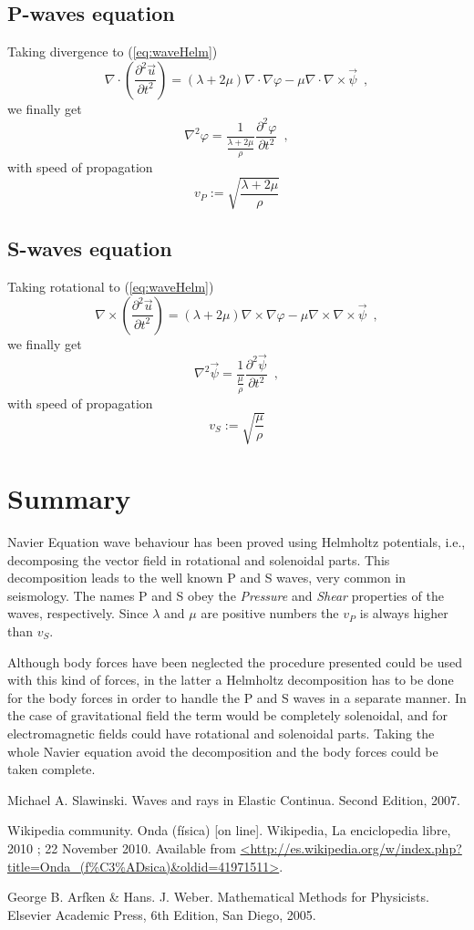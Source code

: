 \documentclass[12pt,letterpaper]{article}
\newcommand{\pardiff}[2]{\frac{\partial #1}{\partial #2}}
\begin{document}
\subsection{P-waves equation}
Taking divergence to (\ref{eq:waveHelm})
\[\nabla\cdot \left( \pardiff{^2 \vec{u}}{t^2} \right)= (\lambda +2\mu) \nabla\cdot \nabla \varphi - \mu\nabla\cdot\nabla\times \vec{\psi} \enspace , \]
we finally get
\begin{equation}
\nabla^2 \varphi = \frac{1}{\frac{\lambda + 2\mu}{\rho}} \pardiff{^2 \varphi}{t^2} \enspace ,
\label{eq:pWave}
\end{equation}
with speed of propagation
\[v_P := \sqrt{\frac{\lambda + 2\mu}{\rho}}\]

\subsection{S-waves equation}
Taking rotational to (\ref{eq:waveHelm})
\[\nabla\times \left( \pardiff{^2 \vec{u}}{t^2} \right)= (\lambda +2\mu) \nabla\times \nabla \varphi - \mu\nabla\times\nabla\times \vec{\psi} \enspace , \]
we finally get
\begin{equation}
\nabla^2 \vec{\psi} = \frac{1}{\frac{\mu}{\rho}} \pardiff{^2 \vec{\psi}}{t^2} \enspace ,
\label{eq:SWave}
\end{equation}
with speed of propagation
\[v_S := \sqrt{\frac{\mu}{\rho}}\]

\section{Summary}

Navier Equation wave behaviour has been proved using Helmholtz potentials, i.e., decomposing the vector field in rotational and solenoidal parts. This decomposition leads to the well known P and S waves, very common in seismology. The names P and S  obey the \emph{Pressure} and \emph{Shear} properties of the waves, respectively. Since $\lambda$ and $\mu$ are positive numbers the $v_P$ is always higher than $v_S$.

Although body forces have been neglected the procedure presented could be used with this kind of forces, in the latter a Helmholtz decomposition has to be done for the body forces in order to handle the P and S waves in a separate manner. In the case of gravitational field the term would be completely solenoidal, and for electromagnetic fields could have rotational and solenoidal parts. Taking the whole Navier equation avoid the decomposition and the body forces could be taken complete.
\pagebreak

\begin{thebibliography}{99}
 Michael A. Slawinski. Waves and rays in Elastic Continua. Second Edition, 2007.
 
 Wikipedia community. Onda (f\'isica) [on line]. Wikipedia, La enciclopedia libre, 2010 ; 22 November 2010. Available from \url{<http://es.wikipedia.org/w/index.php?title=Onda_(f%C3%ADsica)&oldid=41971511>}. 

 George B. Arfken \& Hans. J. Weber. Mathematical Methods for Physicists. Elsevier Academic Press, 6th Edition, San Diego, 2005.
\end{thebibliography}
\end{document}
